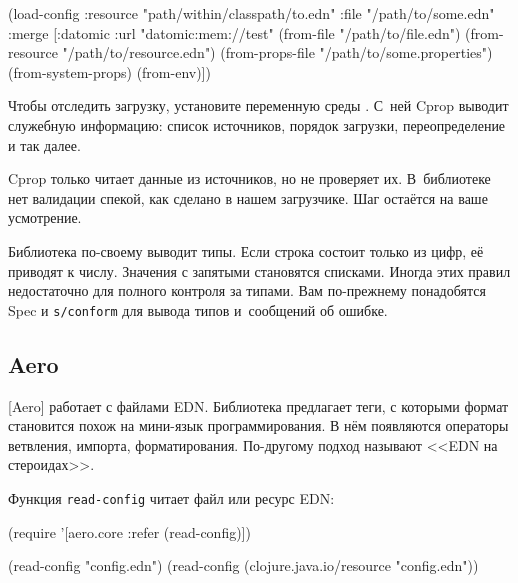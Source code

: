 \else

\begin{english}
  \begin{clojure}
(load-config
 :resource "path/within/classpath/to.edn"
 :file "/path/to/some.edn"
 :merge [{:datomic {:url "datomic:mem://test"}}
         (from-file "/path/to/file.edn")
         (from-resource "/path/to/resource.edn")
         (from-props-file "/path/to/some.properties")
         (from-system-props)
         (from-env)])
  \end{clojure}
\end{english}

\fi

Чтобы отследить загрузку, установите переменную среды . С~ней
Cprop выводит служебную информацию: список источников, порядок загрузки,
переопределение и так далее.

Cprop только читает данные из источников, но не проверяет их. В~библиотеке нет
валидации спекой, как сделано в нашем загрузчике. Шаг остаётся на ваше
усмотрение.

Библиотека по-своему выводит типы. Если строка состоит только из цифр, её
приводят к числу. Значения с запятыми становятся списками. Иногда этих правил
недостаточно для полного контроля за типами. Вам по-прежнему понадобятся
Spec и \verb|s/conform| для вывода типов и~сообщений об ошибке.

\subsection{Aero}


[Aero] работает с файлами
EDN. Библиотека предлагает теги, с которыми формат становится похож на мини-язык
программирования. В нём появляются операторы ветвления, импорта,
форматирования. По-другому подход называют <<EDN на стероидах>>.


Функция \verb|read-config| читает файл или ресурс EDN:

\pagebreakafive

\ifnarrow

\begin{english}
  \begin{clojure}
(require
  '[aero.core :refer (read-config)])

(read-config "config.edn")
(read-config
  (clojure.java.io/resource
    "config.edn"))
  \end{clojure}
\end{english}

